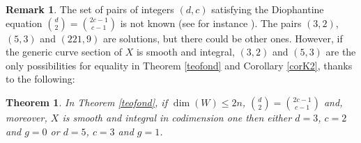 \documentclass{amsart}
\newtheorem{theorem}{Theorem}
\theoremstyle{definition}
\newtheorem{remark}{Remark}
\begin{document}
\begin{remark}\label{rem:dioph}
The set of pairs of integers $(d,c)$ satisfying the Diophantine
equation $\binom{d}{2}=\binom{2c-1}{c-1}$ is not known (see for
instance \cite{dw}). The pairs $(3,2)$, $(5,3)$ and $(221,9)$ are
solutions, but there could be other ones. However, if the generic
curve section of $X$ is smooth and integral, $(3,2)$ and $(5,3)$ are
the only possibilities for equality in Theorem \ref{teofond} and
Corollary \ref{corK2}, thanks to the following:
\end{remark}

\begin{theorem}\label{teofondter}
In Theorem \ref{teofond}, if $\dim(W)\leq 2n$,
$\binom{d}{2}=\binom{2c-1}{c-1}$ and, moreover, $X$ is smooth and
integral in codimension one then either $d=3$, $c=2$ and $g=0$ or
$d=5$, $c=3$ and $g=1$.
\end{theorem}
\end{document}
